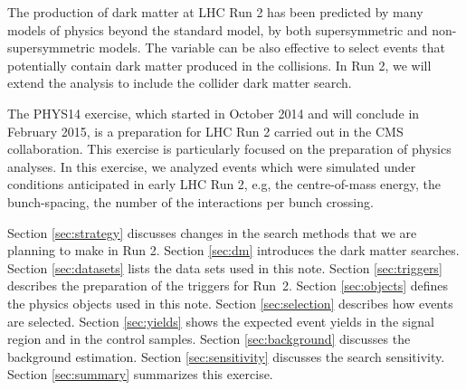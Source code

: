 The production of dark matter at LHC Run 2 has been predicted by many
models of physics beyond the standard model, by both supersymmetric and
non-supersymmetric models. The variable \alphat can be also effective to
select events that potentially contain dark matter produced in the
collisions. In Run 2, we will extend the \alphat analysis to include the
collider dark matter search.

The PHYS14 exercise, which started in October 2014 and will conclude in
February 2015, is a preparation for LHC Run 2 carried out in the CMS
collaboration. This exercise is particularly focused on the preparation
of physics analyses. In this exercise, we analyzed events which were
simulated under conditions anticipated in early LHC Run 2, e.g, the
centre-of-mass energy, the bunch-spacing, the number of the interactions
per bunch crossing.

Section \ref{sec:strategy} discusses changes in the search methods that
we are planning to make in Run 2. Section \ref{sec:dm} introduces the
dark matter searches. Section \ref{sec:datasets} lists the data sets
used in this note. Section \ref{sec:triggers} describes the preparation
of the triggers for Run~2. Section \ref{sec:objects} defines the physics
objects used in this note. Section \ref{sec:selection} describes how
events are selected. Section \ref{sec:yields} shows the expected event yields in the signal region and in the control samples. 
Section \ref{sec:background} discusses the
background estimation. Section \ref{sec:sensitivity} discusses the
search sensitivity. Section \ref{sec:summary} summarizes this exercise.





